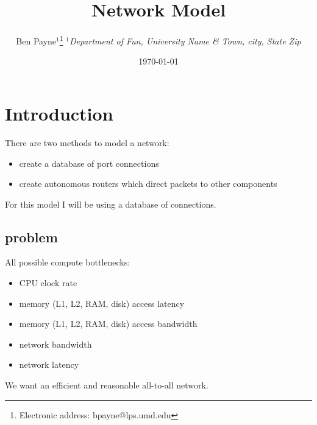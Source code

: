 \documentclass[pdftex]{article}
\begin{document}
\title{Network Model}

\author{Ben Payne$^{1}$\footnote{Electronic address: bpayne@lps.umd.edu}
{\it $^{1}$Department of Fun, University Name \& Town, city, State Zip}}

\date{\today}



\tableofcontents


\section{Introduction}

There are two methods to model a network:
\begin{itemize}
 \item create a database of port connections
 \item create autonomous routers which direct packets to other components
\end{itemize}
For this model I will be using a database of connections.

\subsection{problem}

All possible compute bottlenecks:
\begin{itemize}
 \item CPU clock rate
 \item memory (L1, L2, RAM, disk) access latency
 \item memory (L1, L2, RAM, disk) access bandwidth
 \item network bandwidth
 \item network latency
\end{itemize}

We want an efficient and reasonable all-to-all network. 
\end{document}
